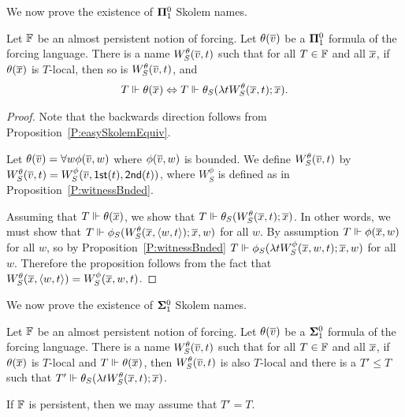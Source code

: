 We now prove the existence of $\mathbf{\Pi}^0_1$ Skolem names.

\begin{prop}
Let $\mathbb{F}$ be an almost persistent notion of forcing.
Let $\theta(\overline{v})$ be a $\mathbf{\Pi}^0_1$ formula of the forcing language.
There is a name $W^\theta_S(\overline{v},t)$
such that for all $T\in\mathbb{F}$ and all $\overline{x}$, if $\theta(\overline{x})$ is $T$-local,
then so is $W^\theta_S(\overline{v},t)$, and
\begin{align*}
T\Vdash\theta(\overline{x})
	\Leftrightarrow  T\Vdash\theta_S(\lambda tW_S^\theta(\overline{x},t);\overline{x}).
\end{align*}
\end{prop}
\begin{proof}
Note that the backwards direction follows from Proposition~\ref{P:easySkolemEquiv}.

Let $\theta(\overline{v})=\forall w\phi(\overline{v},w)$ where $\phi(\overline{v},w)$ is bounded.
We define $W^\theta_S(\overline{v},t)$ by $W^\theta_S(\overline{v},t)=W^\phi_S(\overline{v},\mathsf{1st}(t),\mathsf{2nd}(t))$,
where $W^\phi_S$ is defined as in Proposition~\ref{P:witnessBnded}.

Assuming that $T\Vdash\theta(\overline{x})$, we show that $T\Vdash\theta_S(W^\theta_S(\overline{x},t);\overline{x})$.
In other words, we must show that $T\Vdash\phi_S(W^\theta_S(\overline{x},\langle w,t\rangle);\overline{x},w)$
for all $w$.
By assumption $T\Vdash\phi(\overline{x},w)$ for all $w$, so by
Proposition~\ref{P:witnessBnded} $T\Vdash\phi_S(\lambda tW^\phi_S(\overline{x},w,t);\overline{x},w)$ for all $w$.
Therefore the proposition follows from the fact that
$W^\theta_S(\overline{x},\langle w,t\rangle)=W^\phi_S(\overline{x},w,t)$.
\end{proof}

We now prove the existence of $\mathbf{\Sigma}^0_1$ Skolem names.

\begin{prop}[\RCAo]\label{P:witnessSigma1}
Let $\mathbb{F}$ be an almost persistent notion of forcing.
Let $\theta(\overline{v})$ be a $\mathbf{\Sigma}^0_1$ formula of the forcing language.
There is a name $W^\theta_S(\overline{v},t)$
such that for all $T\in\mathbb{F}$ and all $\overline{x}$, if $\theta(\overline{x})$ is $T$-local
and $T\Vdash\theta(\overline{x})$, then $W^\theta_S(\overline{v},t)$ is also $T$-local
and there is a $T'\leq T$ such that $T'\Vdash\theta_S(\lambda tW_S^\theta(\overline{x},t);\overline{x})$.

If $\mathbb{F}$ is persistent, then we may assume that $T'=T$.
\end{prop}

